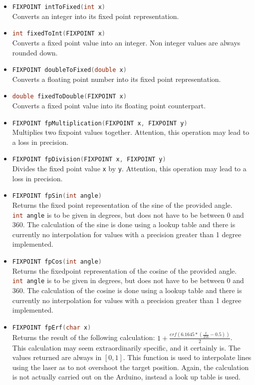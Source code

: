 \documentclass{report}
\begin{document}
\begin{itemize}
	\item \lstinline[language=c++]{FIXPOINT intToFixed(int x)} \\
		Converts an integer into its fixed point representation.
	\item \lstinline[language=c++]{int fixedToInt(FIXPOINT x)} \\
		Converts a fixed point value into an integer. Non integer values are always rounded down.
	\item \lstinline[language=c++]{FIXPOINT doubleToFixed(double x)} \\
		Converts a floating point number into its fixed point representation.
	\item \lstinline[language=c++]{double fixedToDouble(FIXPOINT x)} \\
		Converts a fixed point value into its floating point counterpart. 
	\item \lstinline[language=c++]{FIXPOINT fpMultiplication(FIXPOINT x, FIXPOINT y)} \\
		Multiplies two fixpoint values together. Attention, this operation may lead to a loss in precision.
	\item \lstinline[language=c++]{FIXPOINT fpDivision(FIXPOINT x, FIXPOINT y)} \\
		Divides the fixed point value \lstinline{x} by \lstinline{y}. Attention, this operation may lead to a loss in precision.
	\item \lstinline[language=c++]{FIXPOINT fpSin(int angle)} \\
		Returns the fixed point representation of the sine of the provided angle. \\
		\lstinline[language=c++]{int angle} is to be given in degrees, but does not have to be between 0 and 360. The calculation of the sine is done using a lookup table and there is currently no interpolation for values with a precision greater than 1 degree implemented.
	\item \lstinline[language=c++]{FIXPOINT fpCos(int angle)} \\
		Returns the fixedpoint representation of the cosine of the provided angle. \\
		\lstinline[language=c++]{int angle} is to be given in degrees, but does not have to be between 0 and 360. The calculation of the cosine is done using a lookup table and there is currently no interpolation for values with a precision greater than 1 degree implemented.
	\item \lstinline[language=c++]{FIXPOINT fpErf(char x)} \\
		Returns the result of the following calculation: $ 1 + \frac{erf( 6.1645 * (\frac{x}{256} - 0.5 ) ) }{2}$. \\
		This calculation may seem extraordinarily specific, and it certainly is. The values returned are always in $[0,1]$. This function is used to interpolate lines using the laser as to not overshoot the target position. Again, the calculation is not actually carried out on the Arduino, instead a look up table is used.
\end{itemize}
\end{document}
